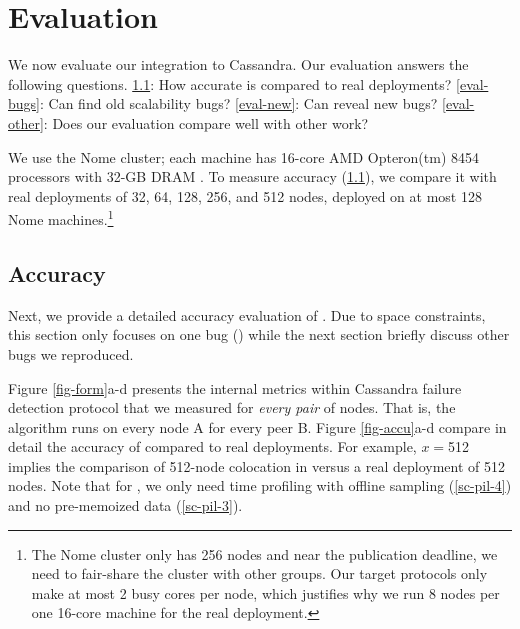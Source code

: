 
\section{Evaluation}
\label{sec-sck-eval}


We now evaluate our \sck integration to Cassandra. Our evaluation answers the
following questions.
%
\sec\ref{eval-accu}: How accurate is \sck compared to real deployments?
%
\sec\ref{eval-bugs}: Can \sck find old scalability bugs?
%
\sec\ref{eval-new}: Can \sck reveal new bugs?
%
%
\sec\ref{eval-other}: Does our evaluation compare well with other work?


We use the Nome cluster; each machine has 16-core AMD Opteron(tm) 8454
processors with 32-GB DRAM \cite{NomeNodes}.
%
To measure \sck accuracy (\sec\ref{eval-accu}), we compare it with real
deployments of 32, 64, 128, 256, and 512 nodes, deployed on at most 128 Nome
machines.\footnote{The Nome cluster only has 256 nodes and near the publication
deadline, we need to fair-share the cluster with other groups.  Our target
protocols only make at most 2 busy cores per node, which justifies why we run 8
nodes per one 16-core machine for the real deployment.}
%

\subsection{Accuracy}
\label{eval-accu}

\def \fff        {$f$}
\def \flaps      {\textit{\#flaps}\xspace}
\def \gosLast    {$T_{lastGossip}$\xspace}
\def \gosAvg     {$T_{avgGossip}$\xspace}
\def \gosProc    {$T_{gossipExec}$\xspace}
\def \supProc    {$T_{stateUpdate}$\xspace}
\def \hops       {\textit{\#hops}\xspace}

\def \ringTable  {$Size_{ringTable}$\xspace}
\def \newStates  {$Size_{newStates}$\xspace}
\def \cpuSpeed   {$CPU$\xspace}


Next, we provide a detailed accuracy evaluation of \sck.  Due to space
constraints, this section only focuses on one bug (\caone \cite{CA-One}) 
while the next
section briefly discuss other bugs we reproduced.




Figure \ref{fig-form}a-d presents the  internal metrics within
Cassandra failure detection protocol that we measured for {\em every pair}
of nodes.  That is, the algorithm runs on every node A for every peer B.
%
Figure \ref{fig-accu}a-d compare in detail the accuracy of \sck compared
to real deployments.
%
For example, $x$$=$512 implies the comparison of 512-node colocation in
\sck versus a real deployment of 512 nodes.
%
Note that for \caone, we only need time profiling with offline sampling
(\sec\ref{sc-pil-4}) and no pre-memoized data (\sec\ref{sc-pil-3}).  
%


